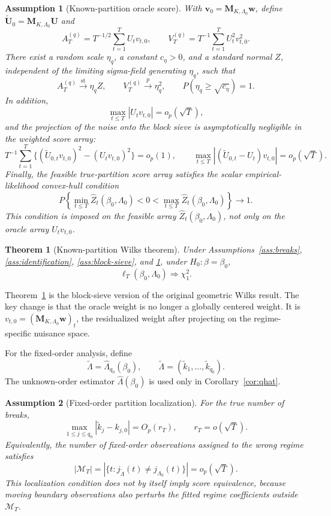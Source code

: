 \documentclass[12pt]{article} %
\numberwithin{equation}{section}
\newtheorem{theorem}{Theorem}
\newtheorem{assumption}{Assumption}
\theoremstyle{definition}
\begin{document}
\begin{assumption}[Known-partition oracle score]
\label{ass:oracle}
With \(\bm v_0=\bm M_{K,\Lambda_0}\bm w\), define \(\widetilde{\bm U}_0=\bm M_{K,\Lambda_0}\bm U\) and
\[
    A_T^{(q)}
    =
    T^{-1/2}\sum_{t=1}^T U_tv_{t,0},
    \qquad
    V_T^{(q)}
    =
    T^{-1}\sum_{t=1}^T U_t^2v_{t,0}^2.
\]
There exist a random scale \(\eta_q\), a constant \(c_\eta>0\), and a standard normal \(Z\), independent of the limiting sigma-field generating \(\eta_q\), such that
\[
    A_T^{(q)}\xrightarrow{\mathrm{st}}\eta_qZ,
    \qquad
    V_T^{(q)}\xrightarrow{p}\eta_q^2,
    \qquad
    P(\eta_q\geq\sqrt{c_\eta})=1.
\]
In addition,
\[
    \max_{t\leq T}|U_tv_{t,0}|=o_p(\sqrt T),
\]
and the projection of the noise onto the block sieve is asymptotically negligible in the weighted score array:
\[
    T^{-1}\sum_{t=1}^T
    \{(\widetilde U_{0,t}v_{t,0})^2-(U_tv_{t,0})^2\}
    =o_p(1),
    \qquad
    \max_{t\leq T}|(\widetilde U_{0,t}-U_t)v_{t,0}|
    =o_p(\sqrt T).
\]
Finally, the feasible true-partition score array satisfies the scalar empirical-likelihood convex-hull condition
\[
    P\left\{
    \min_{t\leq T}\widehat Z_t(\beta_0,\Lambda_0)<0<
    \max_{t\leq T}\widehat Z_t(\beta_0,\Lambda_0)
    \right\}\to1.
\]
This condition is imposed on the feasible array \(\widehat Z_t(\beta_0,\Lambda_0)\), not only on the oracle array \(U_tv_{t,0}\).
\end{assumption}

\begin{theorem}[Known-partition Wilks theorem]
\label{thm:known-wilks}
Under Assumptions~\ref{ass:breaks}, \ref{ass:identification}, \ref{ass:block-sieve}, and \ref{ass:oracle}, under \(H_0:\beta=\beta_0\),
\[
    \ell_T(\beta_0,\Lambda_0)\Rightarrow\chi_1^2.
\]
\end{theorem}

Theorem~\ref{thm:known-wilks} is the block-sieve version of the original geometric Wilks result. The key change is that the oracle weight is no longer a globally centered weight. It is \(v_{t,0}=(\bm M_{K,\Lambda_0}\bm w)_t\), the residualized weight after projecting on the regime-specific nuisance space.

For the fixed-order analysis, define
\[
    \widetilde\Lambda
    =
    \widehat\Lambda_{q_0}(\beta_0),
    \qquad
    \widetilde\Lambda=(\widetilde k_1,\ldots,\widetilde k_{q_0}).
\]
The unknown-order estimator \(\widehat\Lambda(\beta_0)\) is used only in Corollary~\ref{cor:qhat}.

\begin{assumption}[Fixed-order partition localization]
\label{ass:partition-localization}
For the true number of breaks,
\[
    \max_{1\leq j\leq q_0}
    |\widetilde k_j-k_{j,0}|
    =
    O_p(r_T),
    \qquad
    r_T=o(\sqrt T).
\]
Equivalently, the number of fixed-order observations assigned to the wrong regime satisfies
\[
    |\mathcal M_T|
    =
    \left|
    \{t:j_{\widetilde\Lambda}(t)\neq j_{\Lambda_0}(t)\}
    \right|
    =
    o_p(\sqrt T).
\]
This localization condition does not by itself imply score equivalence, because moving boundary observations also perturbs the fitted regime coefficients outside \(\mathcal M_T\).
\end{assumption}
\end{document}
